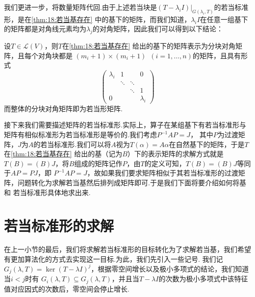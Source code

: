 我们更进一步，将数量矩阵代回.由于上述若当块是$(T-\lambda_iI)\vert_{G(\lambda_i,T)}$的若当标准形，是在\autoref{thm:18:若当基存在}
中的基下的矩阵，而我们知道，$\lambda_iI$在任意一组基下的矩阵都是对角线元素均为$\lambda_j$的对角矩阵，因此我们可以得到以下结论：
\begin{theorem}
    设$T\in \mathcal{L}(V)$，则$T$在\autoref{thm:18:若当基存在} 给出的基下的矩阵表示为分块对角矩阵，且每个对角块都是
    $(m_i+1)\times(m_i+1)\enspace(i=1,\ldots,n)$的矩阵，且具有形式\[\begin{pmatrix}
        \lambda_i & 1 &  & 0 \\  & \ddots & \ddots &  \\  &  &  \ddots & 1 \\ 0 &  &  & \lambda_i
    \end{pmatrix}\]而整体的分块对角矩阵即为若当形矩阵.
\end{theorem}

接下来我们需要描述矩阵的若当标准形.实际上，算子在某组基下有若当标准形与矩阵有相似标准形为若当标准形是等价的.我们考虑$P^{-1}AP=J$，
其中$P$为过渡矩阵，$J$为$A$的若当标准形.我们可以将$A$视为$T(\alpha)=A\alpha$在自然基下的矩阵，于是$T$在\autoref{thm:18:若当基存在}
给出的基（记为$B$）下的表示矩阵的求解方式就是$T(B)=(B)J$，将$B$组成的矩阵记作$P$，由$T$的定义可知，$T(B)=(B)J$等同于$AP=PJ$，即
$P^{-1}AP=J$，故如果我们要求矩阵相似于其若当标准形的过渡矩阵，问题转化为求解若当基然后排列成矩阵即可.于是我们下面将要介绍如何将基和
若当标准形具体地求出来.

\section{若当标准形的求解}
在上一小节的最后，我们将求解若当标准形的目标转化为了求解若当基，我们希望有更加算法化的方式去实现这一目标.为此，我们先引入一些记号.
我们记$G_j(\lambda,T)=\ker (T-\lambda I)^j$，根据零空间增长以及极小多项式的结论，我们知道当$i<j$时有
$G_i(\lambda,T)\subseteq G_j(\lambda,T)$，并且当$T-\lambda I$的次数为极小多项式中该特征值对应因式的次数后，零空间会停止增长.

